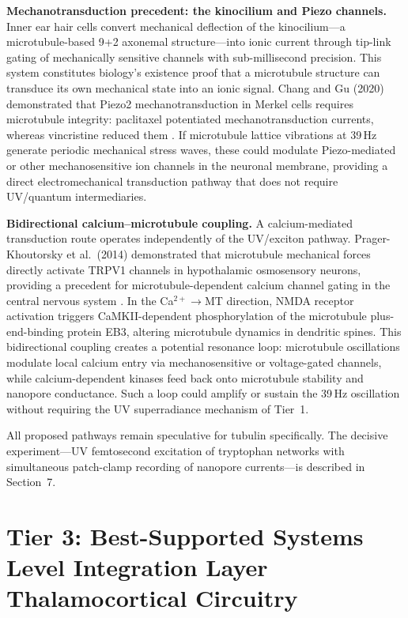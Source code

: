 \documentclass[10pt, a4paper, twocolumn]{article}
\begin{document}
\textbf{Mechanotransduction precedent: the kinocilium and
Piezo channels.} Inner ear hair cells convert mechanical
deflection of the kinocilium---a microtubule-based 9+2
axonemal structure---into ionic current through tip-link
gating of mechanically sensitive channels with sub-millisecond
precision. This system constitutes biology's existence proof
that a microtubule structure can transduce its own mechanical
state into an ionic signal. Chang and Gu (2020) demonstrated
that Piezo2 mechanotransduction in Merkel cells requires
microtubule integrity: paclitaxel potentiated
mechanotransduction currents, whereas vincristine reduced
them \cite{chang2020piezo}. If microtubule lattice vibrations
at 39\,Hz generate periodic mechanical stress waves, these
could modulate Piezo-mediated or other mechanosensitive ion
channels in the neuronal membrane, providing a direct
electromechanical transduction pathway that does not require
UV/quantum intermediaries.

\textbf{Bidirectional calcium--microtubule coupling.}
A calcium-mediated transduction route operates independently
of the UV/exciton pathway. Prager-Khoutorsky et al.\ (2014)
demonstrated that microtubule mechanical forces directly
activate TRPV1 channels in hypothalamic osmosensory neurons,
providing a precedent for microtubule-dependent calcium
channel gating in the central nervous system
\cite{pragerkhoutorsky2014}. In the
Ca$^{2+}$$\to$MT direction, NMDA receptor activation triggers
CaMKII-dependent phosphorylation of the microtubule
plus-end-binding protein EB3, altering microtubule dynamics
in dendritic spines. This bidirectional coupling creates a
potential resonance loop: microtubule oscillations modulate
local calcium entry via mechanosensitive or voltage-gated
channels, while calcium-dependent kinases feed back onto
microtubule stability and nanopore conductance. Such a loop
could amplify or sustain the 39\,Hz oscillation without
requiring the UV superradiance mechanism of Tier~1.

All proposed pathways remain speculative for tubulin specifically.
The decisive experiment---UV femtosecond excitation of tryptophan
networks with simultaneous patch-clamp recording of nanopore
currents---is described in Section~7.

\section{Tier 3: Best-Supported Systems Level Integration
Layer Thalamocortical Circuitry}
\end{document}
